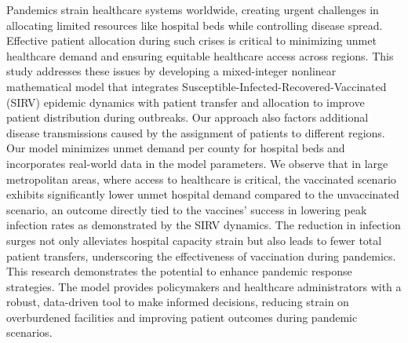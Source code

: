 \documentclass{article}
\begin{document}
\fontsize{10}{12}\selectfont




\begin{ieomabstract}
    Pandemics strain healthcare systems worldwide, creating urgent challenges in allocating limited resources like hospital beds while controlling disease spread. Effective patient allocation during such crises is critical to minimizing unmet healthcare demand and ensuring equitable healthcare access across regions. This study addresses these issues by developing a mixed-integer nonlinear mathematical model that integrates Susceptible-Infected-Recovered-Vaccinated (SIRV) epidemic dynamics with patient transfer and allocation to improve patient distribution during outbreaks. Our approach also factors additional disease transmissions caused by the assignment of patients to different regions. Our model minimizes unmet demand per county for hospital beds and incorporates real-world data in the model parameters. We observe that in large metropolitan areas, where access to healthcare is critical, the vaccinated scenario exhibits significantly lower unmet hospital demand compared to the unvaccinated scenario, an outcome directly tied to the vaccines' success in lowering peak infection rates as demonstrated by the SIRV dynamics. The reduction in infection surges not only alleviates hospital capacity strain but also leads to fewer total patient transfers, underscoring the effectiveness of vaccination during pandemics. This research demonstrates the potential to enhance pandemic response strategies. The model provides policymakers and healthcare administrators with a robust, data-driven tool to make informed decisions, reducing strain on overburdened facilities and improving patient outcomes during pandemic scenarios.
\end{ieomabstract}
\end{document}
